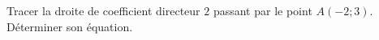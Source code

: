 
\begin{exercice}\label{exosmath-0614}

    Tracer la droite de coefficient directeur \( 2\) passant par le point \( A(-2;3)\). Déterminer son équation.

\end{exercice}
